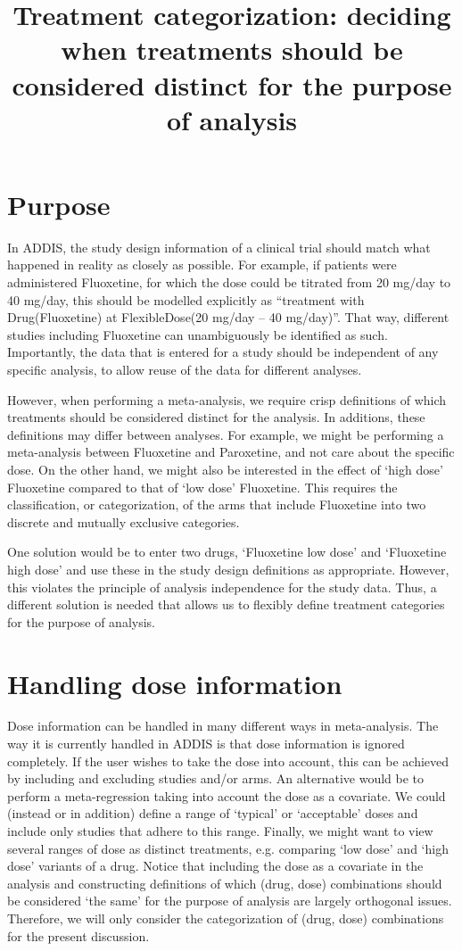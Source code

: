 \documentclass[a4paper]{article}
\title{Treatment categorization: deciding when treatments should be considered distinct for the purpose of analysis}
\date{}
\begin{document}
\maketitle

\section{Purpose}

In ADDIS, the study design information of a clinical trial should match what happened in reality as closely as possible.
For example, if patients were administered Fluoxetine, for which the dose could be titrated from 20 mg/day to 40 mg/day, this should be modelled explicitly as ``treatment with Drug(Fluoxetine) at FlexibleDose(20 mg/day -- 40 mg/day)''.
That way, different studies including Fluoxetine can unambiguously be identified as such.
Importantly, the data that is entered for a study should be independent of any specific analysis, to allow reuse of the data for different analyses.

However, when performing a meta-analysis, we require crisp definitions of which treatments should be considered distinct for the analysis.
In additions, these definitions may differ between analyses.
For example, we might be performing a meta-analysis between Fluoxetine and Paroxetine, and not care about the specific dose.
On the other hand, we might also be interested in the effect of `high dose' Fluoxetine compared to that of `low dose' Fluoxetine.
This requires the classification, or categorization, of the arms that include Fluoxetine into two discrete and mutually exclusive categories.

One solution would be to enter two drugs, `Fluoxetine low dose' and `Fluoxetine high dose' and use these in the study design definitions as appropriate.
However, this violates the principle of analysis independence for the study data.
Thus, a different solution is needed that allows us to flexibly define treatment categories for the purpose of analysis.

\section{Handling dose information}

Dose information can be handled in many different ways in meta-analysis.
The way it is currently handled in ADDIS is that dose information is ignored completely.
If the user wishes to take the dose into account, this can be achieved by including and excluding studies and/or arms.
An alternative would be to perform a meta-regression taking into account the dose as a covariate.
We could (instead or in addition) define a range of `typical' or `acceptable' doses and include only studies that adhere to this range.
Finally, we might want to view several ranges of dose as distinct treatments, e.g. comparing `low dose' and `high dose' variants of a drug.
Notice that including the dose as a covariate in the analysis and constructing definitions of which (drug, dose) combinations should be considered `the same' for the purpose of analysis are largely orthogonal issues.
Therefore, we will only consider the categorization of (drug, dose) combinations for the present discussion.
\end{document}
